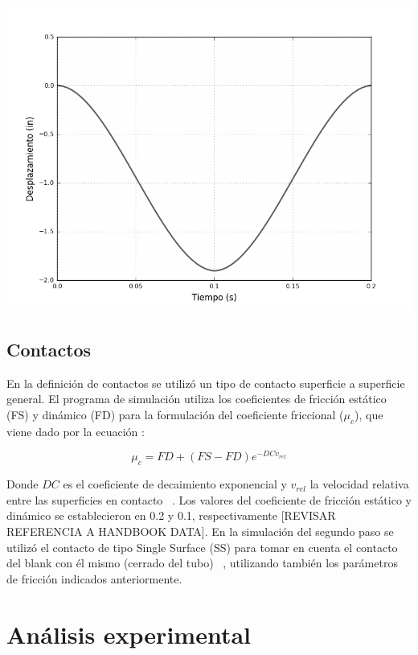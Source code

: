 \begin{center}
\includegraphics[scale=0.6]{src/ch3/smooth_displacement.png}
\label{fig:smooth_displacement}
\end{center}



\subsection{Contactos}

En la definición de contactos se utilizó un tipo de contacto superficie a superficie
general. El programa de simulación utiliza los coeficientes de fricción 
estático (FS) y dinámico (FD) para la formulación del coeficiente friccional ($\mu_c$),
que viene dado por la ecuación :

\begin{equation}
\mu_c = FD + (FS - FD) e^{-DCv_{rel}}
\end{equation}

Donde $DC$ es el coeficiente de decaimiento exponencial y $v_{rel}$ la velocidad relativa
entre las superficies en contacto ~\cite{lsdyna-manual}. Los valores del coeficiente de fricción estático
y dinámico se establecieron en 0.2 y 0.1, respectivamente [REVISAR REFERENCIA A HANDBOOK DATA]. 
En la simulación del segundo paso se utilizó el contacto de tipo Single Surface (SS) para tomar en
cuenta el contacto del blank con él mismo (cerrado del tubo) ~\cite{lsdyna-manual}, utilizando
también los parámetros de fricción indicados anteriormente.


\section{Análisis experimental}


